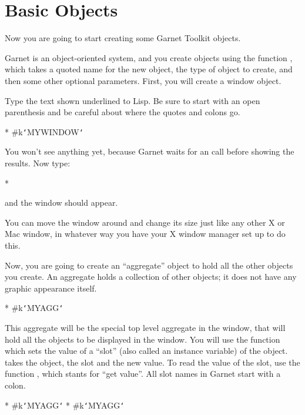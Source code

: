 \section{Basic Objects}
Now you are going to start creating some Garnet Toolkit objects.

Garnet is an object-oriented system, and you create objects using the
function , which takes a quoted name for the new
object, the type of object to create, and then some other optional
parameters.  First, you will create a window object.

Type the text shown underlined to Lisp.  Be sure to start with an open
parenthesis and be careful about where the quotes and colons go.
\begin{programexample}
* 
\#k{\tt\char`\<}MYWINDOW{\tt\char`\>}
\end{programexample}

You won't see anything yet, because Garnet waits for an  call
before showing the results.  Now type:
\begin{programexample}
* 
\end{programexample}
and the window should appear.

You can move the window around and change its size just like any other
X or Mac window, in whatever way you have your X window manager set up
to do this.

Now, you are going to create an ``aggregate'' object to hold all the other
objects you create.  An aggregate holds a collection of other objects; it
does not have any graphic appearance itself.
\begin{programexample}
* 
\#k{\tt\char`\<}MYAGG{\tt\char`\>}
\end{programexample}
This aggregate will be the special top level aggregate in the window, that
will hold all the objects to be displayed in the window.  You will use the
function  which sets the value of a ``slot'' (also called an
instance variable) of the object.   takes the object, the slot
and the new value.  To read the value of the slot, use the function ,
which stants for ``get value''.  All slot names in Garnet start
with a colon.
\begin{programexample}
* 
\#k{\tt\char`\<}MYAGG{\tt\char`\>}
* 
\#k{\tt\char`\<}MYAGG{\tt\char`\>}
\end{programexample}

